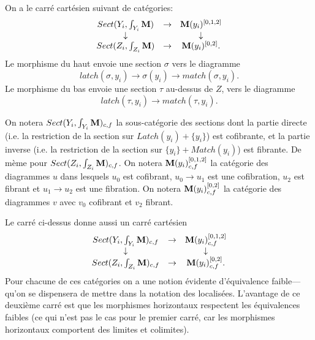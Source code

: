\documentclass[12pt]{article}
\newcommand{\mm}{{\bf M}}
\begin{document}
On a le carr\'e cart\'esien suivant de cat\'egories:
$$
\begin{array}{ccc}
Sect (Y_i,\int _{Y_i}\mm ) & \rightarrow & \mm (y_i) ^{[0,1,2]}\\
\downarrow && \downarrow \\
Sect (Z_i,\int _{Z_i}\mm ) & \rightarrow & \mm (y_i) ^{[0,2]}.
\end{array}
$$
Le morphisme du haut envoie une section $\sigma$ vers le diagramme
$$
latch(\sigma ,y_i) \rightarrow \sigma (y_i) \rightarrow match (\sigma , y_i).
$$
Le morphisme du bas envoie une section $\tau$ au-dessus de $Z$, vers le
diagramme
$$
latch(\tau  ,y_i) \rightarrow  match (\tau , y_i).
$$

On notera $Sect (Y_i,\int _{Y_i}\mm )_{c,f}$ la sous-cat\'egorie des sections
dont la partie directe (i.e. la restriction de la section sur $Latch(y_i)+\{
y_i\}$) est cofibrante, et la partie inverse (i.e. la restriction de la section
sur $\{ y_i\} +Match(y_i)$) est fibrante. De m\`eme pour
$Sect (Z_i,\int _{Z_i}\mm )_{c,f}$. On notera $\mm (y_i) ^{[0,1,2]}_{c,f}$
la cat\'egorie des diagrammes $u$ dans lesquels
$u_0$ est cofibrant, $u_0\rightarrow u_1$ est
une cofibration, $u_2$ est fibrant et $u_1\rightarrow u_2$
est une fibration. On
notera $\mm (y_i) ^{[0,2]}_{c,f}$ la cat\'egorie des diagrammes $v$ avec
$v_0$
cofibrant et $v_2$ fibrant.

Le carr\'e ci-dessus donne aussi un carr\'e cart\'esien
$$
\begin{array}{ccc}
Sect (Y_i,\int _{Y_i}\mm ) _{c,f}& \rightarrow & \mm (y_i) ^{[0,1,2]} _{c,f}\\
\downarrow && \downarrow \\
Sect (Z_i,\int _{Z_i}\mm )  _{c,f}& \rightarrow & \mm (y_i) ^{[0,2]} _{c,f}.
\end{array}
$$
Pour chacune de ces cat\'egories on a une notion \'evidente d'\'equivalence
faible---qu'on se dispensera de mettre dans la notation des localis\'ees.
L'avantage
de ce deuxi\`eme carr\'e est que les morphismes horizontaux respectent les
\'equivalences faibles (ce qui n'est pas le cas pour le premier carr\'e,
car les
morphismes horizontaux comportent des limites et colimites).
\end{document}
